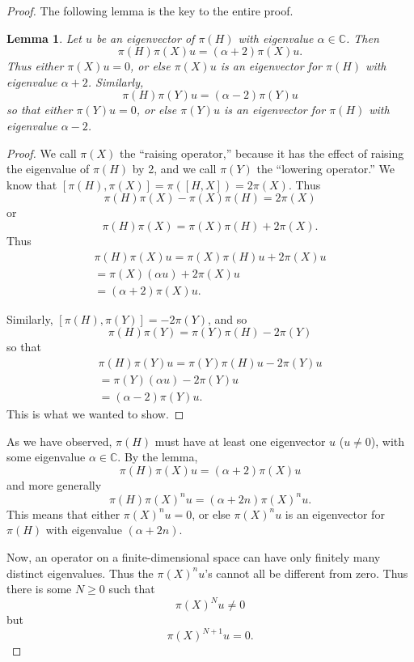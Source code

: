 \documentclass[12pt]{amsbook}
\theoremstyle{plain}
\newtheorem{lemma}[theorem]{Lemma}
\numberwithin{equation}{chapter}
\numberwithin{theorem}{chapter}
\begin{document}
\begin{proof}
The following lemma is the key to the entire proof.

\begin{lemma}
\label{raising.op}Let $u$ be an eigenvector of $\pi(H)$ with eigenvalue
$\alpha\in\mathbb{C}$. Then
\[
\pi(H)\pi(X)u=(\alpha+2)\pi(X)u\text{.}%
\]
Thus either $\pi(X)u=0$, or else $\pi(X)u$ is an eigenvector for $\pi(H)$ with
eigenvalue $\alpha+2$. Similarly,
\[
\pi(H)\pi(Y)u=(\alpha-2)\pi(Y)u
\]
so that either $\pi(Y)u=0$, or else $\pi(Y)u$ is an eigenvector for $\pi(H)$
with eigenvalue $\alpha-2$.
\end{lemma}

\begin{proof}
We call $\pi(X)$ the ``raising operator,'' because it has the effect of
raising the eigenvalue of $\pi(H)$ by 2, and we call $\pi(Y)$ the ``lowering
operator.'' We know that $\left[  \pi(H),\pi(X)\right]  =\pi\left(  \left[
H,X\right]  \right)  =2\pi(X)$. Thus
\[
\pi(H)\pi(X)-\pi(X)\pi(H)=2\pi(X)
\]
or
\[
\pi(H)\pi(X)=\pi(X)\pi(H)+2\pi(X)\text{.}%
\]
Thus
\begin{align*}
\pi(H)\pi(X)u=\pi(X)\pi(H)u+2\pi(X)u\\
=\pi(X)\left(  \alpha u\right)  +2\pi(X)u\\
=(\alpha+2)\pi(X)u\text{.}%
\end{align*}

Similarly, $\left[  \pi(H),\pi(Y)\right]  =-2\pi(Y)$, and so
\[
\pi(H)\pi(Y)=\pi(Y)\pi(H)-2\pi(Y)
\]
so that
\begin{align*}
\pi(H)\pi(Y)u=\pi(Y)\pi(H)u-2\pi(Y)u\\
=\pi(Y)\left(  \alpha u\right)  -2\pi(Y)u\\
=(\alpha-2)\pi(Y)u\text{.}%
\end{align*}
This is what we wanted to show.
\end{proof}

As we have observed, $\pi(H)$ must have at least one eigenvector $u$ ($u\neq
0$), with some eigenvalue $\alpha\in\mathbb{C}$. By the lemma,
\[
\pi(H)\pi(X)u=(\alpha+2)\pi(X)u
\]
and more generally
\[
\pi(H)\pi(X)^{n}u=(\alpha+2n)\pi(X)^{n}u\text{.}%
\]
This means that either $\pi(X)^{n}u=0$, or else $\pi(X)^{n}u$ is an
eigenvector for $\pi(H)$ with eigenvalue $(\alpha+2n)$.

Now, an operator on a finite-dimensional space can have only finitely many
distinct eigenvalues. Thus the $\pi(X)^{n}u$'s cannot all be different from
zero. Thus there is some $N\geq0$ such that
\[
\pi(X)^{N}u\neq0
\]
but
\[
\pi(X)^{N+1}u=0\text{.}%
\]


\end{proof}
\end{document}
